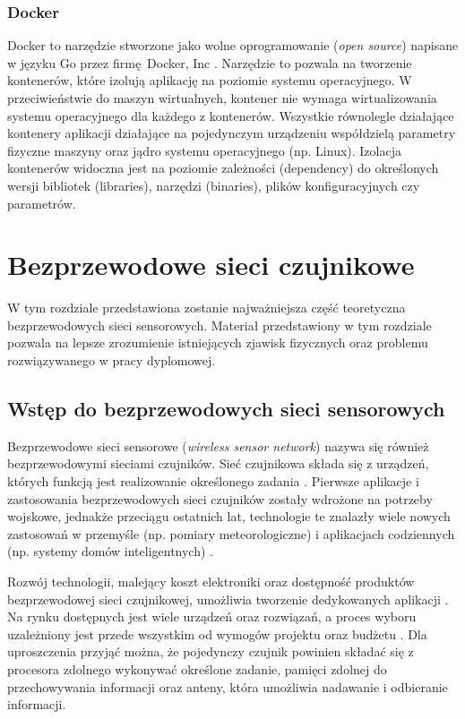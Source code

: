 \documentclass[a4paper,12pt,twoside,openany]{report}
\begin{document}
\subsection{Docker}

Docker to narzędzie stworzone jako wolne oprogramowanie (\textit{open source}) napisane w języku Go przez firmę Docker, Inc \cite{DockerBook}.
Narzędzie to pozwala na tworzenie kontenerów, które izolują aplikację na poziomie systemu operacyjnego. W przeciwieństwie do maszyn wirtualnych, kontener nie wymaga
wirtualizowania systemu operacyjnego dla każdego z kontenerów. Wszystkie równolegle działające kontenery aplikacji działające na pojedynczym urządzeniu współdzielą
parametry fizyczne maszyny oraz jądro systemu operacyjnego (np. Linux). Izolacja kontenerów widoczna jest na poziomie zależności (dependency) do określonych wersji
bibliotek (libraries), narzędzi (binaries), plików konfiguracyjnych czy parametrów.

\chapter{Bezprzewodowe sieci czujnikowe}

W tym rozdziale przedstawiona zostanie najważniejsza część teoretyczna bezprzewodowych sieci sensorowych. Materiał przedstawiony w tym rozdziale
pozwala na lepsze zrozumienie istniejących zjawisk fizycznych oraz problemu rozwiązywanego w pracy dyplomowej.

\section{Wstęp do bezprzewodowych sieci sensorowych}
Bezprzewodowe sieci sensorowe (\textit{wireless sensor network}) nazywa się również bezprzewodowymi sieciami czujników.
Sieć czujnikowa składa się z urządzeń, których funkcją jest realizowanie określonego zadania \cite{Wiley-WSN}.
Pierwsze aplikacje i zastosowania bezprzewodowych sieci czujników zostały wdrożone na potrzeby wojskowe, jednakże przeciągu ostatnich lat, technologie te znalazły
wiele nowych zastosowań w przemyśle (np. pomiary meteorologiczne) i aplikacjach codziennych (np. systemy domów inteligentnych) \cite{wsn-future}.

Rozwój technologii, malejący koszt elektroniki oraz dostępność produktów bezprzewodowej sieci czujnikowej, umożliwia tworzenie dedykowanych aplikacji \cite{Petriu}.
Na rynku dostępnych jest wiele urządzeń oraz rozwiązań, a proces wyboru uzależniony jest przede wszystkim od wymogów projektu oraz budżetu \cite{wsn-future} \cite{Yick}.
Dla uproszczenia przyjąć można, że pojedynczy czujnik powinien składać się z procesora zdolnego wykonywać określone zadanie, pamięci zdolnej do przechowywania informacji
oraz anteny, która umożliwia nadawanie i odbieranie informacji.
\end{document}
